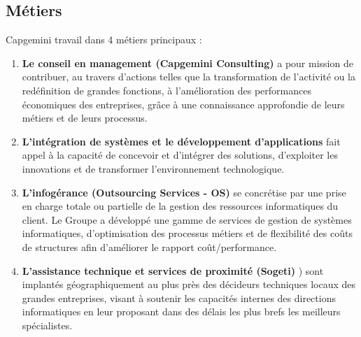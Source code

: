 \subsection{Métiers}
Capgemini travail dans 4 métiers principaux :
\\
\begin{enumerate}
\item \textbf{Le conseil en management (Capgemini Consulting)} a pour mission de contribuer, au travers d’actions telles que la transformation de l’activité ou la redéfinition de grandes fonctions, à l’amélioration des performances économiques des entreprises, grâce à une connaissance approfondie de leurs métiers et de leurs processus.
\item \textbf{L'intégration de systèmes et le développement d'applications} fait appel à la capacité de concevoir et d’intégrer des solutions, d’exploiter les innovations et de transformer l’environnement technologique.
\item \textbf{L’infogérance (Outsourcing Services - OS)} se concrétise par une prise en charge totale ou partielle de la gestion des ressources informatiques du client. Le Groupe a développé une gamme de services de gestion de systèmes informatiques, d’optimisation des processus métiers et de flexibilité des coûts de structures afin d’améliorer le rapport coût/performance.
\item \textbf{L'assistance technique et services de proximité (Sogeti)} ) sont implantés géographiquement au plus près des décideurs techniques locaux des grandes entreprises, visant à soutenir les capacités internes des directions informatiques en leur proposant dans des délais les plus brefs les meilleurs spécialistes.
\end{enumerate}
\begin{figure}[h]
\end{figure}
